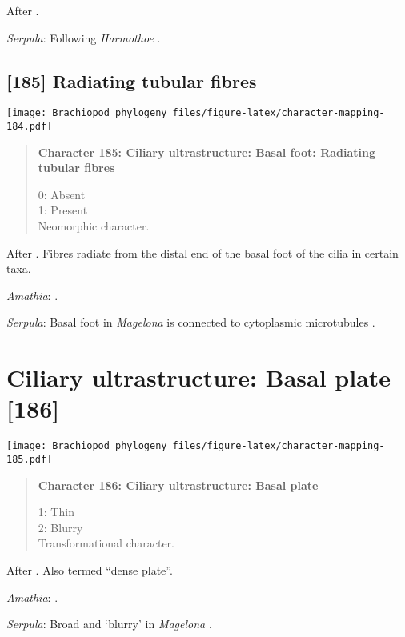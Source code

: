 \documentclass[openany]{book}
\theoremstyle{definition}
\theoremstyle{definition}
\theoremstyle{definition}
\theoremstyle{remark}
\begin{document}
After \citet{Lundin2009}.

\hypertarget{Serpula-coding-184}{}
\emph{Serpula}: Following \emph{Harmothoe} \citep{Holborow1969}.

\subsection*{{[}185{]} Radiating tubular
fibres}\label{radiating-tubular-fibres}

\texttt{[image: Brachiopod\_phylogeny\_files/figure-latex/character-mapping-184.pdf]}

\begin{quote}
\textbf{Character 185: Ciliary ultrastructure: Basal foot: Radiating
tubular fibres}

0: Absent\\
1: Present\\
Neomorphic character.
\end{quote}

After \citet{Lundin2009}. Fibres radiate from the distal end of the
basal foot of the cilia in certain taxa.

\hypertarget{Amathia-coding-185}{}
\emph{Amathia}: \citet{Reed1982}.

\hypertarget{Serpula-coding-185}{}
\emph{Serpula}: Basal foot in \emph{Magelona} is connected to
cytoplasmic microtubules \citep{Bartolomaeus1995}.

\section{Ciliary ultrastructure: Basal plate
{[}186{]}}\label{ciliary-ultrastructure-basal-plate-186}

\texttt{[image: Brachiopod\_phylogeny\_files/figure-latex/character-mapping-185.pdf]}

\begin{quote}
\textbf{Character 186: Ciliary ultrastructure: Basal plate}

1: Thin\\
2: Blurry\\
Transformational character.
\end{quote}

After \citet{Lundin2009}. Also termed ``dense plate''.

\hypertarget{Amathia-coding-186}{}
\emph{Amathia}: \citet{Reed1982}.

\hypertarget{Serpula-coding-186}{}
\emph{Serpula}: Broad and `blurry' in \emph{Magelona}
\citep{Bartolomaeus1995}.
\end{document}

